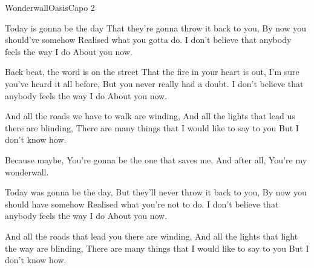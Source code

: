 
\begin{song}{Wonderwall}{Oasis}{Capo 2}


Today is gonna be the day
That they're gonna throw it back to you,
By now you should've somehow
Realised what you gotta do.
I don't believe that anybody feels the way I do
About you now.

Back beat, the word is on the street
That the fire in your heart is out,
I'm sure you've heard it all before,
But you never really had a doubt.
I don't believe that anybody feels the way I do
About you now.

And all the roads we have to walk are winding,
And all the lights that lead us there are blinding,
There are many things that I would like to say to you
But I don't know how.

Because maybe,
You're gonna be the one that saves me,
And after all,
You're my wonderwall.

Today was gonna be the day,
But they'll never throw it back to you,
By now you should have somehow
Realised what you're not to do.
I don't believe that anybody feels the way I do
About you now.

And all the roads that lead you there are winding,
And all the lights that light the way are blinding,
There are many things that I would like to say to you
But I don't know how.


\end{song}
